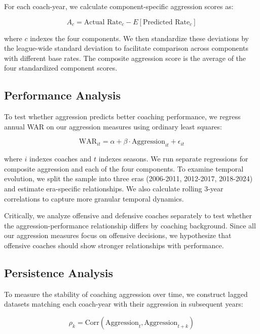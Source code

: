 \documentclass[11pt,twocolumn]{article}
\begin{document}
For each coach-year, we calculate component-specific aggression scores as:

\begin{equation}
A_c = \text{Actual Rate}_c - E[\text{Predicted Rate}_c]
\end{equation}

where $c$ indexes the four components. We then standardize these deviations by the league-wide standard deviation to facilitate comparison across components with different base rates. The composite aggression score is the average of the four standardized component scores.

\subsection{Performance Analysis}

To test whether aggression predicts better coaching performance, we regress annual WAR on our aggression measures using ordinary least squares:

\begin{equation}
\text{WAR}_{it} = \alpha + \beta \cdot \text{Aggression}_{it} + \epsilon_{it}
\end{equation}

where $i$ indexes coaches and $t$ indexes seasons. We run separate regressions for composite aggression and each of the four components. To examine temporal evolution, we split the sample into three eras (2006-2011, 2012-2017, 2018-2024) and estimate era-specific relationships. We also calculate rolling 3-year correlations to capture more granular temporal dynamics.

Critically, we analyze offensive and defensive coaches separately to test whether the aggression-performance relationship differs by coaching background. Since all our aggression measures focus on offensive decisions, we hypothesize that offensive coaches should show stronger relationships with performance.

\subsection{Persistence Analysis}

To measure the stability of coaching aggression over time, we construct lagged datasets matching each coach-year with their aggression in subsequent years:

\begin{equation}
\rho_k = \text{Corr}(\text{Aggression}_{t}, \text{Aggression}_{t+k})
\end{equation}
\end{document}

